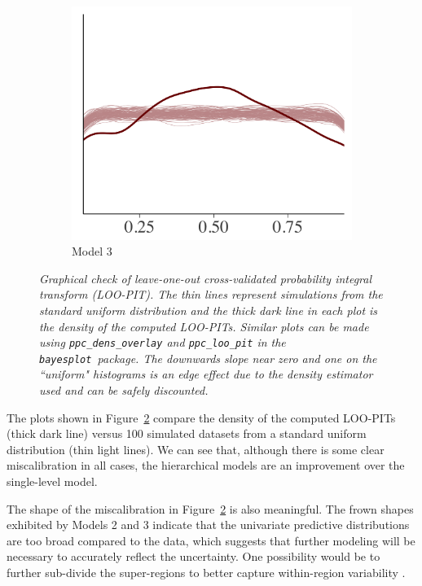 \documentclass{statsoc}
\newcommand{\bayesplot}{{\tt bayesplot}}
\begin{document}
\begin{figure}
\begin{subfigure}{0.31\textwidth}
\includegraphics[width=\textwidth]{ppc_loo_pit_overlay3.png}
\caption{Model 3}
\label{fig:ppc_loo_pit_unif3}
\end{subfigure}

\caption{\it Graphical check of leave-one-out cross-validated probability
integral transform (LOO-PIT). The thin lines represent simulations from the
standard uniform distribution and the thick dark line in each plot is the
density of the computed LOO-PITs. Similar plots can be made using 
{\tt ppc\_dens\_overlay} and {\tt ppc\_loo\_pit}  in the \bayesplot\ package. The
downwards slope near zero and one on the ``uniform" histograms is an edge effect
due to the density estimator used and can be safely discounted.}
\label{fig:ppc_loo_pit_unif}
\end{figure}

The plots shown in Figure~\ref{fig:ppc_loo_pit_unif} compare the density of the
computed LOO-PITs (thick dark line) versus 100 simulated datasets from a
standard uniform distribution (thin light lines).  We can see that, although
there is some clear miscalibration in all cases, the hierarchical models are an
improvement over the single-level model.

The shape of the miscalibration in Figure~\ref{fig:ppc_loo_pit_unif} is also
meaningful. The frown shapes exhibited by Models 2 and 3 indicate that the
univariate predictive distributions are too broad compared to the data, which
suggests that further modeling will be necessary to accurately reflect the
uncertainty. One possibility would be to further sub-divide the super-regions to
better capture within-region variability \citep{shaddick2017data}.
\end{document}
